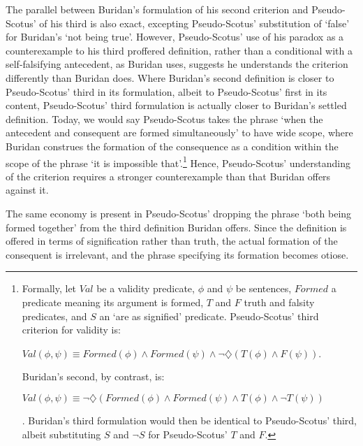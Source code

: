 	The parallel between Buridan's formulation of his second criterion and Pseudo-Scotus' of his third is also exact, excepting Pseudo-Scotus' substitution of `false' for Buridan's `not being true'. However, Pseudo-Scotus' use of his paradox as a counterexample to his third proffered definition, rather than a conditional with a self-falsifying antecedent, as Buridan uses, suggests he understands the criterion differently than Buridan does. Where Buridan's second definition is closer to Pseudo-Scotus' third in its formulation, albeit to Pseudo-Scotus' first in its content, Pseudo-Scotus' third formulation is actually closer to Buridan's settled definition. Today, we would say Pseudo-Scotus takes the phrase `when the antecedent and consequent are formed simultaneously' to have wide scope, where Buridan construes the formation of the consequence as a condition within the scope of the phrase `it is impossible that'.\footnote{Formally, let $Val$ be a validity predicate, $\phi$ and $ \psi$ be sentences, $Formed$ a predicate meaning its argument is formed, $T$ and $F$ truth and falsity predicates, and $S$ an `are as signified' predicate. Pseudo-Scotus' third criterion for validity is: 
		\begin{center}
			$Val(\phi, \psi) \equiv Formed(\phi) \wedge  Formed(\psi) \wedge \neg \diamondsuit(T(\phi) \wedge F(\psi))$.
		\end{center}
		Buridan's second, by contrast, is:
		\begin{center}
			$Val(\phi, \psi) \equiv \neg \diamondsuit(Formed(\phi) \wedge Formed(\psi) \wedge T(\phi) \wedge \neg T(\psi))$
		\end{center}. Buridan's third formulation would then be identical to Pseudo-Scotus' third, albeit substituting $S$ and $\neg S$ for Pseudo-Scotus' $T$ and $F$.} Hence, Pseudo-Scotus' understanding of the criterion requires a stronger counterexample than that Buridan offers against it.
	
	The same economy is present in Pseudo-Scotus' dropping the phrase `both being formed together' from the third definition Buridan offers. Since the definition is offered in terms of signification rather than truth, the actual formation of the consequent is irrelevant, and the phrase specifying its formation becomes otiose.
	
